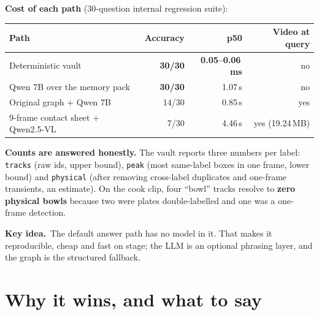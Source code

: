\documentclass[10pt,a4paper]{article}
\makeatletter
\newcommand{\code}[1]{\texttt{\small #1}}
\newcommand{\needspace}[1]{%
  \par\penalty-100
  \begingroup
  \dimen@=#1\relax
  \ifdim\pagegoal<\maxdimen
    \advance\dimen@\pagetotal
    \ifdim\dimen@>\pagegoal
      \vfil\break
    \fi
  \fi
  \endgroup}
\newcommand{\keyidea}[1]{%
  \par\medskip\noindent\colorbox{panel}{%
    \begin{minipage}{\dimexpr\linewidth-2\fboxsep\relax}
    \vspace{2pt}\textbf{\textcolor{accent}{Key idea.}}\ #1\vspace{2pt}
    \end{minipage}}\par\medskip
}
\makeatother
\begin{document}
\noindent
\textbf{Cost of each path} (30-question internal regression suite):

\begin{center}
\small
\begin{tabularx}{\linewidth}{@{}L r r r@{}}
\toprule
\textbf{Path} & \textbf{Accuracy} & \textbf{p50} & \textbf{Video at query} \\
\midrule
Deterministic vault & \textbf{30/30} & \textbf{0.05--0.06\,ms} & no \\
Qwen 7B over the memory pack & \textbf{30/30} & 1.07\,s & no \\
Original graph + Qwen 7B & 14/30 & 0.85\,s & yes \\
9-frame contact sheet + Qwen2.5-VL & 7/30 & 4.46\,s & yes (19.24\,MB) \\
\bottomrule
\end{tabularx}
\end{center}

\needspace{7\baselineskip}

\noindent
\textbf{Counts are answered honestly.} The vault reports three numbers per label: \code{tracks}
(raw ids, upper bound), \code{peak} (most same-label boxes in one frame, lower bound) and
\code{physical} (after removing cross-label duplicates and one-frame transients, an estimate). On the
cook clip, four ``bowl'' tracks resolve to \textbf{zero physical bowls} because two were plates
double-labelled and one was a one-frame detection.

\keyidea{The default answer path has no model in it. That makes it reproducible, cheap and fast on
stage; the LLM is an optional phrasing layer, and the graph is the structured fallback.}

\section{Why it wins, and what to say}
\end{document}
